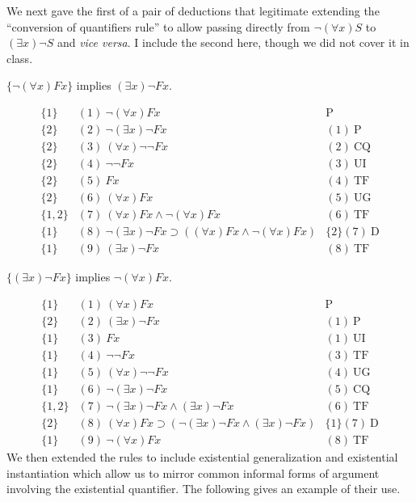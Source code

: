 We next gave the first of a pair of deductions that legitimate extending the ``conversion of quantifiers rule'' to allow passing directly from $\neg(\forall x)S$ to $(\exists x)\neg S$ and \emph{vice versa}. I include the second here, though we did not cover it in class.
\begin{center}
$\{\neg(\forall x)Fx\}$ implies $(\exists x)\neg Fx.$
\end{center}
\[
\begin{array}{lll}
\{1\}   & (1)\  \neg(\forall x)Fx &  \mathrm{P}\\
\{2\}   & (2)\ \neg(\exists x)\neg Fx & (1) \ \mathrm{P}\\
\{2\}   & (3)\ (\forall x)\neg\neg Fx &  (2)\ \mathrm{CQ}\\
\{2\}   & (4)\ \neg\neg Fx   & (3)\ \mathrm{UI}\\
\{2\}   & (5)\ Fx   & (4)\ \mathrm{TF}\\
\{2\}   & (6)\ (\forall x)Fx  & (5)\ \mathrm{UG}\\
\{1,2\}   & (7)\ (\forall x)Fx\wedge\neg(\forall x)Fx  & (6)\ \mathrm{TF}\\
\{1\}   & (8)\ \neg(\exists x)\neg Fx\supset((\forall x)Fx\wedge\neg(\forall x)Fx)  & \{2\}(7)\ \mathrm{D}\\
\{1\}   & (9)\ (\exists x)\neg Fx  & (8)\ \mathrm{TF}
\end{array}
\]
\begin{center}
$\{(\exists x)\neg Fx\}$ implies $\neg(\forall x)Fx.$
\end{center}
\[
\begin{array}{lll}
\{1\}   & (1)\  (\forall x)Fx &  \mathrm{P}\\
\{2\}   & (2)\ (\exists x)\neg Fx & (1) \ \mathrm{P}\\
\{1\}   & (3)\ Fx &  (1)\ \mathrm{UI}\\
\{1\}   & (4)\ \neg\neg Fx   & (3)\ \mathrm{TF}\\
\{1\}   & (5)\ (\forall x)\neg\neg Fx   & (4)\ \mathrm{UG}\\
\{1\}   & (6)\ \neg(\exists x)\neg Fx  & (5)\ \mathrm{CQ}\\
\{1,2\}   & (7)\ \neg(\exists x)\neg Fx\wedge(\exists x)\neg Fx  & (6)\ \mathrm{TF}\\
\{2\}   & (8)\ (\forall x)Fx\supset(\neg(\exists x)\neg Fx\wedge(\exists x)\neg Fx)  & \{1\}(7)\ \mathrm{D}\\
\{1\}   & (9)\ \neg(\forall x)Fx  & (8)\ \mathrm{TF}
\end{array}
\]
\iffalse
We then extended the rules to include existential generalization and existential instantiation which allow us to mirror common informal forms of argument involving the existential quantifier. The following gives an example of their use.
